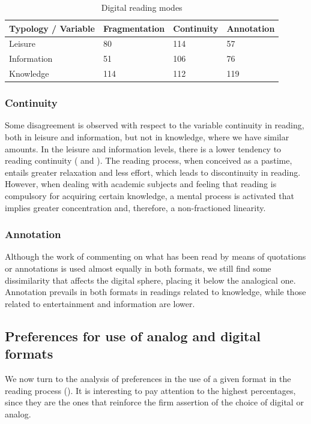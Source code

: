 \documentclass[english]{textolivre}
\begin{document}
\begin{table}[h!]
\centering
\begin{threeparttable}
\caption{Digital reading modes}
\begin{tabular}{llll}
\toprule
Typology / Variable & Fragmentation & Continuity & Annotation \\
\midrule
Leisure & 80 & 114 & 57 \\
Information & 51 & 106 & 76 \\
Knowledge & 114 & 112 & 119 \\
\bottomrule
\end{tabular}
\label{tab07}
\end{threeparttable}
\end{table}

\subsubsection{Continuity}
Some disagreement is observed with respect to the variable continuity in reading, both in leisure and information, but not in knowledge, where we have similar amounts. In the leisure and information levels, there is a lower tendency to reading continuity ( and ). The reading process, when conceived as a pastime, entails greater relaxation and less effort, which leads to discontinuity in reading. However, when dealing with academic subjects and feeling that reading is compulsory for acquiring certain knowledge, a mental process is activated that implies greater concentration and, therefore, a non-fractioned linearity.

\subsubsection{Annotation}
Although the work of commenting on what has been read by means of quotations or annotations is used almost equally in both formats, we still find some dissimilarity that affects the digital sphere, placing it below the analogical one. Annotation prevails in both formats in readings related to knowledge, while those related to entertainment and information are lower. \\

\subsection{Preferences for use of analog and digital formats}
We now turn to the analysis of preferences in the use of a given format in the reading process (). It is interesting to pay attention to the highest percentages, since they are the ones that reinforce the firm assertion of the choice of digital or analog. 
\end{document}
